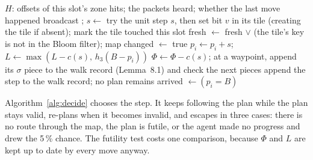 \documentclass[11pt,a4paper]{article}
\begin{document}
\begin{algorithm}[htbp]
\caption{One slot of agent $i$, in the order of execution}\label{alg:slot}
\begin{algorithmic}[1]
\Require $H$: offsets of this slot's zone hits;\; the packets heard;\; whether the last move happened
   \EndFor
\State {} 
\State broadcast  
 ;   \EndFor
\State $s\gets$  
 try the unit step $s$, then   \EndIf
\Statex
{} 
   \Return \EndIf
  \State set bit $v$ in its tile (creating the tile if absent); mark the tile touched this slot
  \State fresh $\gets$ fresh $\lor$ (the tile's key is not in the Bloom filter);\; map changed $\gets$ true
\EndFunction
{}
    \State $p_i\gets p_i+s$;\; $L\gets\max(L-c(s),\,h_3(B-p_i))$ 
     $\Phi\gets\Phi-c(s)$; at a waypoint, append its $\sigma$ piece to the walk record
      (Lemma~8.1) and check the next pieces
    \Else\; append the step to the walk record; no plan remains
    \EndIf
    \State arrived $\gets(p_i=B)$
  \Else \; 
  \EndIf
\EndFunction
\end{algorithmic}
\end{algorithm}

Algorithm~\ref{alg:decide} chooses the step. It keeps following the plan while the plan stays valid, re-plans when
it becomes invalid, and escapes in three cases: there is no route through the map, the plan is futile, or the agent
made no progress and drew the 5\,\% chance. The futility test costs one comparison, because $\Phi$ and $L$ are kept
up to date by every move anyway.
\end{document}
